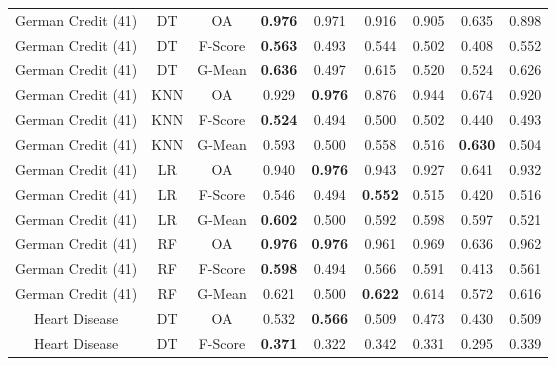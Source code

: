 \begin{longtable}{ccccccccc}
German Credit (41) &         DT &      OA & \textbf{0.976} &          0.971 &          0.916 &          0.905 &          0.635 &          0.898 \\
German Credit (41) &         DT & F-Score & \textbf{0.563} &          0.493 &          0.544 &          0.502 &          0.408 &          0.552 \\
German Credit (41) &         DT &  G-Mean & \textbf{0.636} &          0.497 &          0.615 &          0.520 &          0.524 &          0.626 \\
German Credit (41) &        KNN &      OA &          0.929 & \textbf{0.976} &          0.876 &          0.944 &          0.674 &          0.920 \\
German Credit (41) &        KNN & F-Score & \textbf{0.524} &          0.494 &          0.500 &          0.502 &          0.440 &          0.493 \\
German Credit (41) &        KNN &  G-Mean &          0.593 &          0.500 &          0.558 &          0.516 & \textbf{0.630} &          0.504 \\
German Credit (41) &         LR &      OA &          0.940 & \textbf{0.976} &          0.943 &          0.927 &          0.641 &          0.932 \\
German Credit (41) &         LR & F-Score &          0.546 &          0.494 & \textbf{0.552} &          0.515 &          0.420 &          0.516 \\
German Credit (41) &         LR &  G-Mean & \textbf{0.602} &          0.500 &          0.592 &          0.598 &          0.597 &          0.521 \\
German Credit (41) &         RF &      OA & \textbf{0.976} & \textbf{0.976} &          0.961 &          0.969 &          0.636 &          0.962 \\
German Credit (41) &         RF & F-Score & \textbf{0.598} &          0.494 &          0.566 &          0.591 &          0.413 &          0.561 \\
German Credit (41) &         RF &  G-Mean &          0.621 &          0.500 & \textbf{0.622} &          0.614 &          0.572 &          0.616 \\
     Heart Disease &         DT &      OA &          0.532 & \textbf{0.566} &          0.509 &          0.473 &          0.430 &          0.509 \\
     Heart Disease &         DT & F-Score & \textbf{0.371} &          0.322 &          0.342 &          0.331 &          0.295 &          0.339 \\

\end{longtable}
